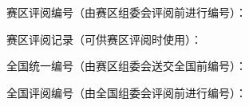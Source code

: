 {%
        \par\vfill
        赛区评阅编号（由赛区组委会评阅前进行编号）：\par\vfill\vfill

        赛区评阅记录（可供赛区评阅时使用）：\vspace{1\ccwd}

        \begin{center}
        \end{center}\vspace{1\ccwd}

        全国统一编号（由赛区组委会送交全国前编号）：\par\vfill\vfill

        全国评阅编号（由全国组委会评阅前进行编号）：\par\vfill\vfill\vfill
}
\renewcommand{\baselinestretch}{1.3}\normalsize